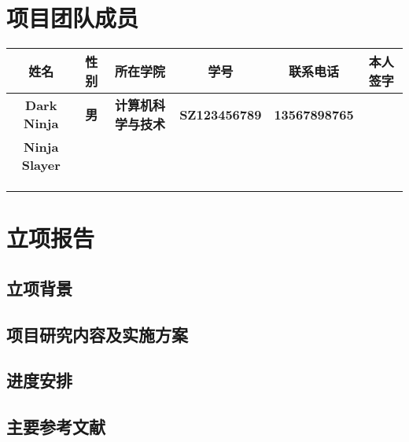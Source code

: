 \documentclass{project_env}
\begin{document}
\section{ 项目团队成员 }
\begin{table}[h]
	\centering
	\begin{adjustbox}{width=1\textwidth}
		\begin{tabular}{|c|c|c|c|c|c|}
			\hline
			\textbf{姓名}         & \textbf{性别} & \textbf{所在学院}         & \textbf{学号}        & \textbf{联系电话}    & \textbf{本人签字} \\ \hline
			\textbf{Dark Ninja}   & \textbf{男}   & \textbf{计算机科学与技术} & \textbf{SZ123456789} & \textbf{13567898765} & \textbf{}         \\ \hline
			\textbf{Ninja Slayer} & \textbf{}     & \textbf{}                 & \textbf{}            & \textbf{}            & \textbf{}         \\ \hline
			\textbf{}             & \textbf{}     & \textbf{}                 & \textbf{}            & \textbf{}            & \textbf{}         \\ \hline
			\textbf{}             & \textbf{}     & \textbf{}                 & \textbf{}            & \textbf{}            & \textbf{}         \\ \hline
			\textbf{}             & \textbf{}     & \textbf{}                 & \textbf{}            & \textbf{}            & \textbf{}         \\ \hline
		\end{tabular}
	\end{adjustbox}
\end{table}

\section{ 立项报告 }
\begin{mdframed}{%
		\subsection{ 立项背景 } %
		\subsection{ 项目研究内容及实施方案 }
		\subsection{ 进度安排 }
		\subsection{ 主要参考文献 } %
		\vfil
	}
\end{mdframed}
\end{document}
